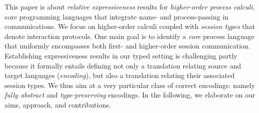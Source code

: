 \noi 
This paper is about \emph{relative expressiveness} results for 
\emph{higher-order process calculi}, core programming languages that 
integrate name- and process-passing in communications.
We focus on higher-order calculi coupled with \emph{session types} that denote interaction protocols. 
One main goal is to identify
a \emph{core} process language %
that uniformly encompasses both first- and higher-order session communication.
Establishing expressiveness results 
in our typed setting 
is challenging partly because 
 it formally entails defining 
 not only a translation 
relating source and target languages (\emph{encoding}), but also a translation 
relating their associated session types. 
We thus aim at a very particular class of correct encodings: namely \emph{fully abstract} and \emph{type-preserving} encodings.
In the following, we elaborate on our aims,   approach, and contributions.

